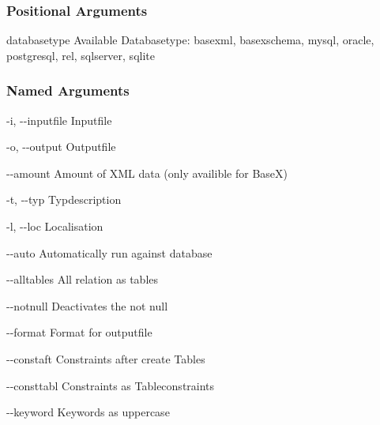 \documentclass[letterpaper,10pt,english,openany,oneside]{sphinxmanual}
\begin{document}
\begin{sphinxVerbatim}[commandchars=\\\{\}]
  \PYG{p}{[}\PYG{p}{]} \PYG{p}{[} \PYG{p}{]} \PYG{p}{[} \PYG{p}{]} \PYG{p}{[} \PYG{p}{]} \PYG{p}{[} \PYG{p}{]}
                  \PYG{p}{[} \PYG{p}{]} \PYG{p}{[}\PYG{p}{]} \PYG{p}{[}\PYG{p}{]} \PYG{p}{[}\PYG{p}{]} \PYG{p}{[}\PYG{p}{]}
                  \PYG{p}{[}\PYG{p}{]} \PYG{p}{[}\PYG{p}{]} \PYG{p}{[}\PYG{p}{]}
\end{sphinxVerbatim}


\subsubsection{Positional Arguments}
\label{\detokenize{cmd_main:Positional Arguments}}\begin{optionlist}{3cm}
\item [databasetype]  
Available Databasetype: basexml, basexschema, mysql, oracle, postgresql, rel, sqlserver, sqlite
\end{optionlist}


\subsubsection{Named Arguments}
\label{\detokenize{cmd_main:Named Arguments_repeat7}}\begin{optionlist}{3cm}
\item [-i, -{-}inputfile]  
Inputfile
\item [-o, -{-}output]  
Outputfile
\item [-{-}amount]  
Amount of XML data (only availible for BaseX)
\item [-t, -{-}typ]  
Typdescription
\item [-l, -{-}loc]  
Localisation
\item [-{-}auto]  
Automatically run against database
\item [-{-}alltables]  
All relation as tables
\item [-{-}notnull]  
Deactivates the not null
\item [-{-}format]  
Format for outputfile
\item [-{-}constaft]  
Constraints after create Tables
\item [-{-}consttabl]  
Constraints as Tableconstraints
\item [-{-}keyword]  
Keywords as uppercase
\end{optionlist}
\end{document}
